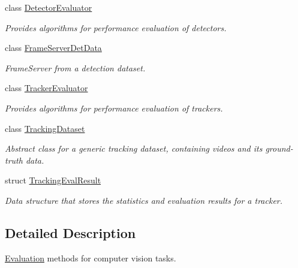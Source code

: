 \begin{DoxyCompactItemize}
class \hyperlink{class_vision_core_1_1_evaluation_1_1_detector_evaluator}{Detector\+Evaluator}
\begin{DoxyCompactList}\small\item\em Provides algorithms for performance evaluation of detectors. \end{DoxyCompactList}\item 
class \hyperlink{class_vision_core_1_1_evaluation_1_1_frame_server_det_data}{Frame\+Server\+Det\+Data}
\begin{DoxyCompactList}\small\item\em Frame\+Server from a detection dataset. \end{DoxyCompactList}\item 
class \hyperlink{class_vision_core_1_1_evaluation_1_1_tracker_evaluator}{Tracker\+Evaluator}
\begin{DoxyCompactList}\small\item\em Provides algorithms for performance evaluation of trackers. \end{DoxyCompactList}\item 
class \hyperlink{class_vision_core_1_1_evaluation_1_1_tracking_dataset}{Tracking\+Dataset}
\begin{DoxyCompactList}\small\item\em Abstract class for a generic tracking dataset, containing videos and its ground-\/truth data. \end{DoxyCompactList}\item 
struct \hyperlink{struct_vision_core_1_1_evaluation_1_1_tracking_eval_result}{Tracking\+Eval\+Result}
\begin{DoxyCompactList}\small\item\em Data structure that stores the statistics and evaluation results for a tracker. \end{DoxyCompactList}\end{DoxyCompactItemize}


\subsection{Detailed Description}
\hyperlink{namespace_vision_core_1_1_evaluation}{Evaluation} methods for computer vision tasks. 